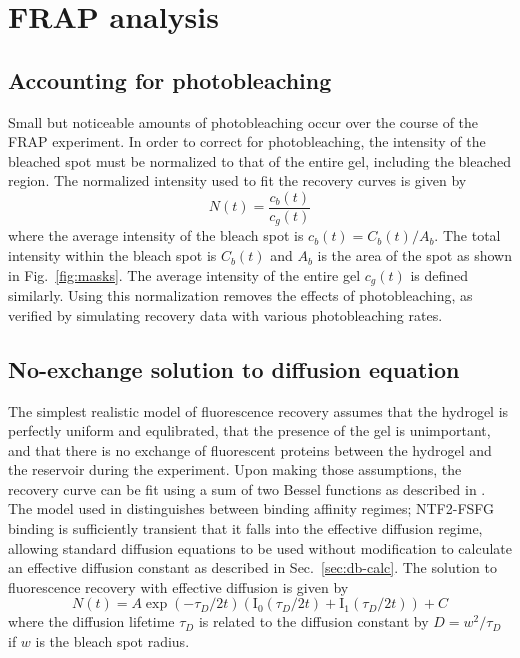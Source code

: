 \section{FRAP analysis}
\label{sec:FRAP-analysis}

\subsection{Accounting for photobleaching}
\label{sec:photobleaching}
Small but noticeable amounts of photobleaching occur over the course of the FRAP experiment.  In order to correct for photobleaching, the intensity of the bleached spot must be normalized to that of the entire gel, including the bleached region.  The normalized intensity used to fit the recovery curves is given by
\begin{equation}
N(t) = \frac{c_b(t)}{c_g(t)}
\end{equation} where the average intensity of the bleach spot is $c_b(t) = C_b(t)/A_b$. The total intensity within the bleach spot is $C_b(t)$ and $A_b$ is the area of the spot as shown in Fig.~\ref{fig:masks}.  The average intensity of the entire gel $c_g(t)$ is defined similarly.  Using this normalization removes the effects of photobleaching, as verified by simulating recovery data with various photobleaching rates.

\subsection{No-exchange solution to diffusion equation}
\label{sec:no-exchange}

The simplest realistic model of fluorescence recovery assumes that the hydrogel is perfectly uniform and equlibrated, that the presence of the gel is unimportant, and that there is no exchange of fluorescent proteins between the hydrogel and the reservoir during the experiment.  Upon making those assumptions, the recovery curve can be fit using a sum of two Bessel functions as described in \cite{yang18,sprague04}.  The model used in \cite{sprague04} distinguishes between binding affinity regimes; NTF2-FSFG binding is sufficiently transient that it falls into the effective diffusion regime, allowing standard diffusion equations to be used without modification to calculate an effective diffusion constant as described in Sec.~\ref{sec:db-calc}.  The solution to fluorescence recovery with effective diffusion is given by
\begin{equation}
N(t) = A\exp(-\tau_D/2t)\left(\mathrm{I}_0(\tau_D/2t)+\mathrm{I}_1(\tau_D/2t)\right)+C
\end{equation} where the diffusion lifetime $\tau_D$ is related to the diffusion constant by $D = w^2/\tau_D$ if $w$ is the bleach spot radius.  

